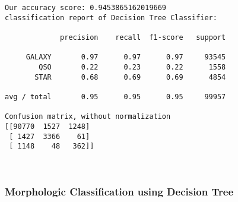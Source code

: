 \documentclass[11pt]{article}
\begin{document}
    \begin{Verbatim}[commandchars=\\\{\}]
Our accuracy score: 0.9453865162019669
classification report of Decision Tree Classifier:

             precision    recall  f1-score   support

     GALAXY       0.97      0.97      0.97     93545
        QSO       0.22      0.23      0.22      1558
       STAR       0.68      0.69      0.69      4854

avg / total       0.95      0.95      0.95     99957

Confusion matrix, without normalization
[[90770  1527  1248]
 [ 1427  3366    61]
 [ 1148    48   362]]

    \end{Verbatim}

    \begin{center}
    \end{center}
    { \hspace*{\fill} \\}
    
    \subsubsection{Morphologic Classification using Decision
Tree}\label{morphologic-classification-using-decision-tree}
\end{document}
